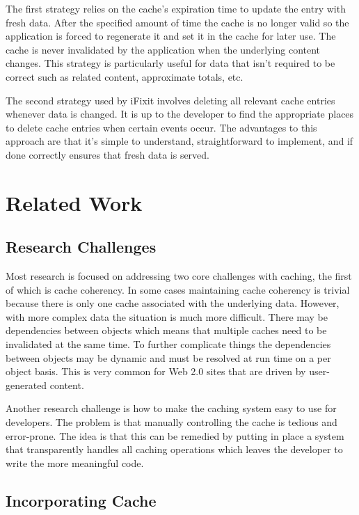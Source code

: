 \documentclass[12pt]{ucthesis}
\begin{document}
The first strategy relies on the cache's expiration time to update the entry with fresh data.
After the specified amount of time the cache is no longer valid so the application is forced to regenerate it and set it in the cache for later use.
The cache is never invalidated by the application when the underlying content changes.
This strategy is particularly useful for data that isn't required to be correct such as related content, approximate totals, etc.

The second strategy used by iFixit involves deleting all relevant cache entries whenever data is changed.
It is up to the developer to find the appropriate places to delete cache entries when certain events occur.
The advantages to this approach are that it's simple to understand, straightforward to implement, and if done correctly ensures that fresh data is served.


\section{Related Work}
\subsection{Research Challenges}
Most research is focused on addressing two core challenges with caching, the first of which is cache coherency.
In some cases maintaining cache coherency is trivial because there is only one cache associated with the underlying data.
However, with more complex data the situation is much more difficult.
There may be dependencies between objects which means that multiple caches need to be invalidated at the same time.
To further complicate things the dependencies between objects may be dynamic and must be resolved at run time on a per object basis.
This is very common for Web 2.0 sites that are driven by user-generated content.

Another research challenge is how to make the caching system easy to use for developers.
The problem is that manually controlling the cache is tedious and error-prone.
The idea is that this can be remedied by putting in place a system that transparently handles all caching operations which leaves the developer to write the more meaningful code.

\subsection{Incorporating Cache}
\end{document}
